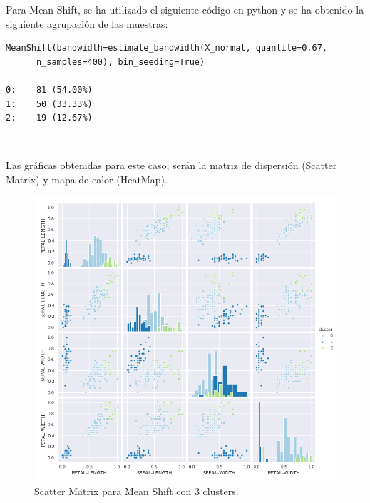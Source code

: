 \documentclass[a4paper, 20pt]{article}
\begin{document}
\clearpage

Para Mean Shift, se ha utilizado el siguiente código en python y se ha obtenido la siguiente agrupación de las muestras:\\

\begin{lstlisting}
MeanShift(bandwidth=estimate_bandwidth(X_normal, quantile=0.67, 
	  n_samples=400), bin_seeding=True)

0:    81 (54.00%)
1:    50 (33.33%)
2:    19 (12.67%)
\end{lstlisting}\

Las gráficas obtenidas para este caso, serán la matriz de dispersión (Scatter Matrix) y mapa de calor (HeatMap).\\

\begin{figure}[h]
\centering
\includegraphics[scale=0.64]{dani/scatmatrixMeanShiftIRIS.png}
\caption{Scatter Matrix para Mean Shift con 3 clusters.}
\label{smms}
\end{figure}

\clearpage
\end{document}
